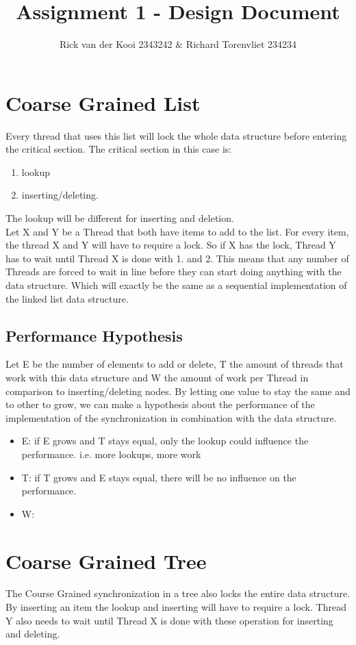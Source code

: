 \documentclass[10pt,a4paper]{article}
\author{Rick van der Kooi 2343242 \& Richard Torenvliet 234234}
\title{Assignment 1 - Design Document}
\begin{document}
\maketitle

\section{Coarse Grained List}
    Every thread that uses this list will lock the
    whole data structure before entering the critical section.
    The critical section in this case is: 
        \begin{enumerate}
        \item lookup
        \item inserting/deleting.
        \end{enumerate}
    The lookup will be different for inserting and deletion.
    \\
    Let X and Y be a Thread that both have items to add to the list. For every
    item, the thread X and Y will have to require a lock. So
    if X has the lock, Thread Y has to wait until Thread X is 
    done with 1. and 2.
    This means that any number of Threads are forced to wait in line before they can start
    doing anything with the data structure. Which will exactly be the same
    as a sequential implementation of the linked list data structure.

\subsection{Performance Hypothesis}
Let E be the number of elements to add or delete, T the amount of threads
that work with this data structure and W the amount of work per Thread in
comparison to inserting/deleting nodes. By letting one value to stay the same
and to other to grow, we can make a hypothesis about the performance of the
implementation of the synchronization in combination with the data structure.
\begin{itemize}
\item E: if E grows and T stays equal, only the lookup could influence the performance.
    i.e. more lookups, more work
 \item T: if T grows and E stays equal, there will be no influence on the performance.
 \item W: 
\end{itemize}

\section{Coarse Grained Tree}
The Course Grained synchronization in a tree also locks the entire
data structure. By inserting an item the lookup and inserting will have to
require a lock. Thread Y also needs to wait until
Thread X is done with these operation for inserting and deleting.
\end{document}
